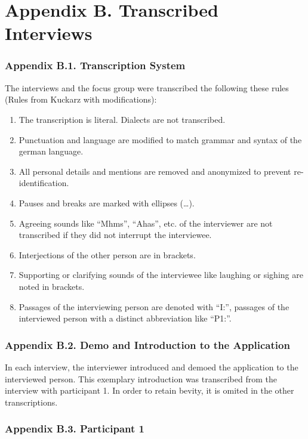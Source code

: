 \documentclass{sigchi}
\begin{document}
\twocolumn
\section{Appendix B. Transcribed Interviews}

\subsubsection{Appendix B.1. Transcription System}
The interviews and the focus group were transcribed the following these rules (Rules from Kuckarz \cite{kuckartz2007} with modifications):
\begin{enumerate}
    \item The transcription is literal. Dialects are not transcribed.
    \item Punctuation and language are modified to match grammar and syntax of the german language.
    \item All personal details and mentions are removed and anonymized to prevent re-identification.
    \item Pauses and breaks are marked with ellipses (\dots).
    \item Agreeing sounds like ``Mhms'', ``Ahas'', etc. of the interviewer are not transcribed if they did not interrupt the interviewee.
    \item Interjections of the other person are in brackets.
    \item Supporting or clarifying sounds of the interviewee like laughing or sighing are noted in brackets.
    \item Passages of the interviewing person are denoted with ``I:'', passages of the interviewed person with a distinct abbreviation like ``P1:''.
\end{enumerate}

\subsubsection{Appendix B.2. Demo and Introduction to the Application}

In each interview, the interviewer introduced and demoed the application to the interviewed person. This exemplary introduction was transcribed from the interview with participant 1. In order to retain bevity, it is omited in the other transcriptions.



\subsubsection{Appendix B.3. Participant 1}
\end{document}
